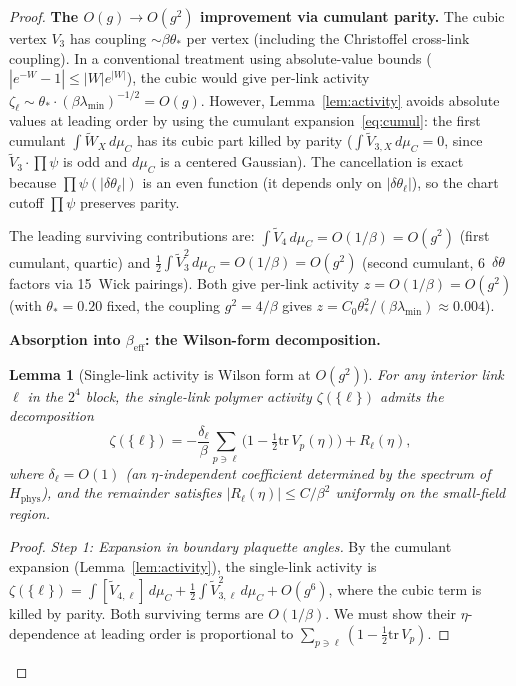 \documentclass[11pt]{article}
\newtheorem{lemma}[theorem]{Lemma}
\theoremstyle{definition}
\newcommand{\tr}{\mathrm{tr}}
\begin{document}
\begin{proof}
\textbf{The $O(g){\to}O(g^2)$ improvement via cumulant parity.}
The cubic vertex $V_3$ has coupling $\sim\beta\theta_*$ per vertex
(including the Christoffel cross-link coupling).  In a conventional
treatment using absolute-value bounds ($|e^{-W}-1|\le|W|e^{|W|}$),
the cubic would give per-link activity
$\zeta_\ell\sim\theta_*\cdot(\beta\lambda_{\min})^{-1/2}=O(g)$.
However, Lemma~\ref{lem:activity} avoids absolute values at leading
order by using the cumulant expansion~\eqref{eq:cumul}: the first
cumulant $\int\widetilde{W}_X\,d\mu_C$ has its cubic part killed by
parity ($\int\widetilde{V}_{3,X}\,d\mu_C=0$, since
$\widetilde{V}_3\cdot\prod\psi$ is odd and $d\mu_C$ is a centered
Gaussian).  The cancellation is exact because $\prod\psi(|\delta\theta_\ell|)$
is an even function (it depends only on $|\delta\theta_\ell|$), so the
chart cutoff $\prod\psi$ preserves parity.

The leading surviving contributions are:
$\int\widetilde{V}_{4}\,d\mu_C=O(1/\beta)=O(g^2)$ (first cumulant, quartic)
and
$\frac{1}{2}\int\widetilde{V}_{3}^2\,d\mu_C=O(1/\beta)=O(g^2)$ (second
cumulant, 6~$\delta\theta$ factors via 15~Wick pairings).
Both give per-link activity $z=O(1/\beta)=O(g^2)$ (with
$\theta_*=0.20$ fixed, the coupling $g^2=4/\beta$ gives
$z=C_0\theta_*^2/(\beta\lambda_{\min})\approx 0.004$).

\textbf{Absorption into $\beta_{\mathrm{eff}}$:
the Wilson-form decomposition.}

\begin{lemma}[Single-link activity is Wilson form at $O(g^2)$]%
\label{lem:wilson-form}
For any interior link $\ell$ in the $2^4$ block, the single-link
polymer activity $\zeta(\{\ell\})$ admits the decomposition
\begin{equation}\label{eq:wilson-decomp}
\zeta(\{\ell\})
=-\frac{\delta_\ell}{\beta}\sum_{p\ni\ell}
\bigl(1-\tfrac{1}{2}\tr\,V_p(\eta)\bigr)
+R_\ell(\eta),
\end{equation}
where $\delta_\ell=O(1)$ (an $\eta$-independent coefficient determined
by the spectrum of $H_{\mathrm{phys}}$), and the remainder satisfies
$|R_\ell(\eta)|\le C/\beta^2$ uniformly on the small-field region.
\end{lemma}

\begin{proof}
\emph{Step 1: Expansion in boundary plaquette angles.}
By the cumulant expansion (Lemma~\ref{lem:activity}), the
single-link activity is
$\zeta(\{\ell\})=\int[\widetilde{V}_{4,\ell}]\,d\mu_C
+\frac{1}{2}\int\widetilde{V}_{3,\ell}^2\,d\mu_C+O(g^6)$,
where the cubic term is killed by parity.  Both surviving
terms are $O(1/\beta)$.  We must show their $\eta$-dependence
at leading order is proportional to
$\sum_{p\ni\ell}(1-\frac{1}{2}\tr\,V_p)$.


\end{proof}
\end{proof}
\end{document}

